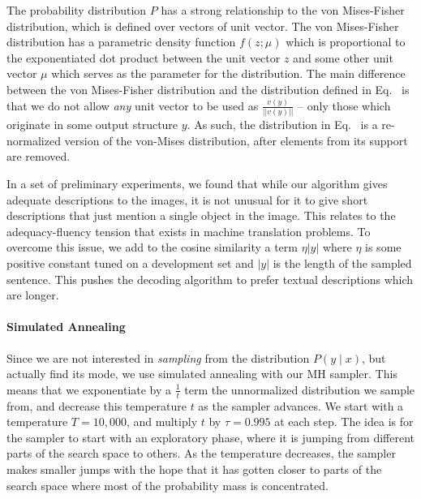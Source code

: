 \documentclass[letterpaper]{article}
\begin{document}
The probability distribution $P$ has a strong relationship to the von Mises-Fisher distribution, which is defined over vectors of unit vector.
The von Mises-Fisher distribution has a parametric density function $f(z ; \mu)$ which is proportional to the exponentiated dot product between the unit vector
$z$ and some other unit vector $\mu$ which serves as the parameter for the distribution. The main difference between the von Mises-Fisher distribution
and the distribution defined in Eq.~ is that we do not allow {\em any} unit vector to be used as $\displaystyle\frac{v(y)}{||v(y)||}$ -- only
those which originate in some output structure $y$. As such, the distribution in Eq.~ is a re-normalized version of the von-Mises distribution,
after elements from its support are removed.

In a set of preliminary experiments, we found that while our algorithm gives adequate descriptions to the images, it is not unusual for it to give short descriptions
that just mention a single object in the image. This relates to the adequacy-fluency tension that exists in machine translation problems. To overcome this issue, we
add to the cosine similarity a term $\eta |y|$ where $\eta$ is some positive constant tuned on a development set and $|y|$ is the
length of the sampled sentence. This pushes the decoding algorithm to prefer textual descriptions which are longer.

\paragraph{Simulated Annealing} Since we are not interested in {\em sampling} from the distribution $P(y \mid x)$, but actually find its mode,
we use simulated annealing with our MH sampler. This means that we exponentiate by a $\displaystyle\frac{1}{t}$ term the unnormalized distribution
we sample from, and decrease this temperature $t$ as the sampler advances. We start with a temperature $T= 10,000$, and multiply $t$ by $\tau = 0.995$ at each step. The idea is for the sampler to start with an exploratory phase, where it is jumping from different parts of the search space
to others. As the temperature decreases, the sampler makes smaller jumps with the hope that it has gotten closer to parts of the search space
where most of the probability mass is concentrated.
\end{document}
